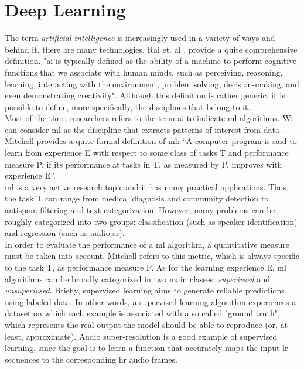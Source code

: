 \section{Deep Learning}
The term \textit{artificial intelligence} is increasingly used in a variety of ways and behind it, there are many technologies. Rai et. al \cite{rai2019editor}, provide a quite comprehensive definition. "\gls{ai} is typically defined as the ability of a machine to perform cognitive functions that we associate with human minds, such as perceiving, reasoning, learning, interacting with the environment, problem solving, decision-making, and even demonstrating creativity". Although this definition is rather generic, it is possible to define, more specifically, the disciplines that belong to it. \\
Most of the time, researchers refers to the term \gls{ai} to indicate \gls{ml} algorithms. We can consider \gls{ml} as the discipline that extracts patterns of interest from data \cite{goodfellow2016deep}. \\
Mitchell \cite{mitchell1997machine} provides a quite formal definition of \gls{ml}: “A computer program is said to learn from experience E with respect to some class of tasks T and performance measure P, if its performance at tasks in T, as measured by P, improves with experience E”.\\
\gls{ml} is a very active research topic and it has many practical applications. Thus, the task T can range from medical diagnosis and community detection to antispam filtering and text categorization. However, many problems can be roughly categorized into two groups: classification (such as speaker identification) and regression (such as audio \gls{sr}). \\
In order to evaluate the performance of a \gls{ml} algorithm, a quantitative measure must be taken into account. Mitchell refers to this metric, which is always specific to the task T, as performance measure P. 
As for the learning experience E, \gls{ml} algorithms can be broadly categorized in two main classes: \textit{superivsed} and \textit{unsuperivsed}. Briefly, supervised learning aims to generate reliable predictions using labeled data. In other words, a supervised learning algorithm experiences a dataset on which each example is associated with a so called "ground truth", which represents the real output the model should be able to reproduce (or, at least, approximate). Audio super-resolution is a good example of supervised learning, since the goal is to learn a function that accurately maps the input \gls{lr} sequences to the corresponding \gls{hr} audio frames. \\
